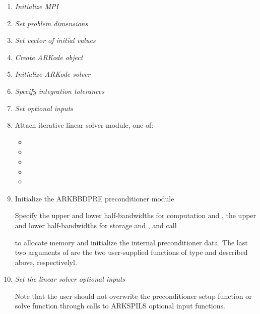 \documentclass[letterpaper,10pt,english]{sphinxmanual}
\begin{document}
\begin{enumerate}
\item {} 
\emph{Initialize MPI}

\item {} 
\emph{Set problem dimensions}

\item {} 
\emph{Set vector of initial values}

\item {} 
\emph{Create ARKode object}

\item {} 
\emph{Initialize ARKode solver}

\item {} 
\emph{Specify integration tolerances}

\item {} 
\emph{Set optional inputs}

\item {} 
Attach iterative linear solver module, one of:
\begin{itemize}
\item {} 

\item {} 

\item {} 

\item {} 

\item {} 

\end{itemize}

\item {} 
Initialize the ARKBBDPRE preconditioner module

Specify the upper and lower half-bandwidths for computation
 and , the upper and lower half-bandwidths for
storage  and , and call


to allocate memory and initialize the internal preconditioner
data. The last two arguments of {\hyperref[c_interface/Preconditioners:c.ARKBBDPrecInit]{\emph{}}} are the
two user-supplied functions of type {\hyperref[c_interface/Preconditioners:c.ARKLocalFn]{\emph{}}} and
{\hyperref[c_interface/Preconditioners:c.ARKCommFn]{\emph{}}} described above, respectivelyl.

\item {} 
\emph{Set the linear solver optional inputs}

Note that the user should not overwrite the preconditioner setup
function or solve function through calls to ARKSPILS optional
input functions.

\end{enumerate}
\end{document}
